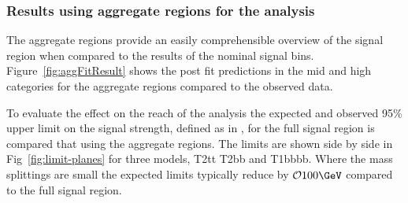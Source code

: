 \subsubsection{Results using aggregate regions for the \alphat analysis}

The aggregate regions provide an easily comprehensible
overview of the signal region when compared to the results
of the nominal signal bins. Figure~\ref{fig:aggFitResult} shows
the post fit predictions in the mid and high \nj categories
for the aggregate regions compared to the observed data.

To evaluate the effect on the reach of the \alphat analysis the expected and observed 95\% upper limit
on the signal strength, defined as in \cite{limit-stuff}, for the full signal region 
is compared that using the aggregate regions. The limits are shown side by side
in Fig~\ref{fig:limit-planes} for three models, T2tt T2bb and T1bbbb. Where the mass
splittings are small the expected limits typically reduce by $\mathcal{O} 100\GeV$ 
compared to the full signal region.

